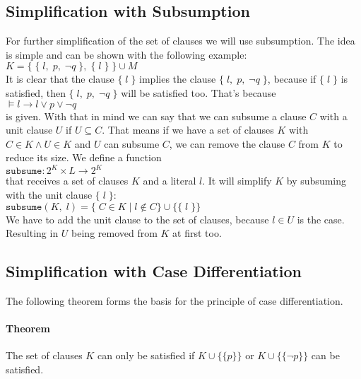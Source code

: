 \subsection{Simplification with Subsumption}
For further simplification of the set of clauses we will use subsumption. The idea is simple and can be shown with the following example:
\\
\hspace*{1.3cm}
$K = \{\; \{\; l,\; p,\; \neg q \;\},\; \{\; l\; \}\; \} \cup M$
\\[0.2cm]
It is clear that the clause $\{\; l\; \}$ implies the clause $\{\; l,\; p,\; \neg q \;\}$, because if $\{\; l\; \}$ is satisfied, then $\{\; l,\; p,\; \neg q \;\}$ will be satisfied too. That's because
\\
\hspace*{1.3cm}
$\models l \to l \lor p \lor \neg q$
\\[0.2cm]
is given. With that in mind we can say that we can subsume a clause $C$ with a unit clause $U$ if $U \subseteq C$. That means if we have a set of clauses $K$ with $C \in K \land U \in K$ and $U$ can subsume $C$, we can remove the clause $C$ from $K$ to reduce its size. We define a function
\\
\hspace*{1.3cm}
$\texttt{subsume}: 2^{K} \times L \to 2^{K}$
\\[0.2cm]
that receives a set of clauses $K$ and a literal $l$. It will simplify $K$ by subsuming with the unit clause $\{\; l\; \}$:
\\
\hspace*{1.3cm}
$\texttt{subsume}(K,\; l) = \{\; C \in K\; |\; l \notin C\} \cup \{\{\; l\; \}\}$
\\[0.2cm]
We have to add the unit clause to the set of clauses, because $l \in U$ is the case. Resulting in $U$ being removed from $K$ at first too. \cite{Stroetman2019}

\subsection{Simplification with Case Differentiation}
The following theorem forms the basis for the principle of case differentiation.

\paragraph{Theorem}
The set of clauses $K$ can only be satisfied if $K \cup \bigl\{\{p\}\bigr\}$ or $K \cup \bigl\{\{\neg p\}\bigr\}$ can be satisfied.

